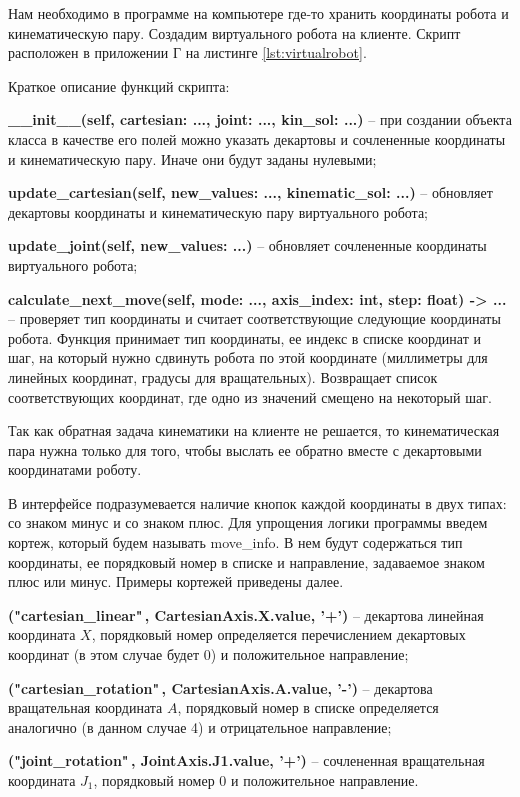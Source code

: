 \documentclass[a4paper,14pt]{extarticle}
\begin{document}
Нам необходимо в программе на компьютере
где-то хранить координаты робота и кинематическую пару.
Создадим виртуального робота на клиенте. Скрипт
расположен в приложении Г на листинге \ref{lst:virtualrobot}.


Краткое описание функций скрипта:
\begin{compactitem}
    \item \textbf{\_\_init\_\_(self, cartesian: ..., joint: ..., kin\_sol: ...)} --
    при создании объекта класса в качестве его полей можно указать декартовы и сочлененные координаты и кинематическую пару.
    Иначе они будут заданы нулевыми;
    \item \textbf{update\_cartesian(self, new\_values: ..., kinematic\_sol: ...)} --
    обновляет декартовы координаты и кинематическую пару виртуального робота;
    \item \textbf{update\_joint(self, new\_values: ...)} -- обновляет сочлененные
    координаты виртуального робота;
    \item \textbf{calculate\_next\_move(self, mode: ..., axis\_index: int, step: float) -> ...} --
    проверяет тип координаты и считает соответствующие следующие координаты робота. Функция принимает тип координаты, ее индекс
    в списке координат и шаг, на который нужно сдвинуть робота по этой координате (миллиметры для линейных координат,
    градусы для вращательных). Возвращает список соответствующих координат, где одно из значений смещено на некоторый шаг.
\end{compactitem}


Так как обратная задача кинематики на клиенте не решается, то кинематическая пара
нужна только для того, чтобы выслать ее обратно вместе с декартовыми координатами роботу.


В интерфейсе подразумевается наличие кнопок каждой координаты в двух типах: со знаком минус и со знаком плюс.
Для упрощения логики программы введем кортеж, который будем называть move\_info. В нем будут содержаться
тип координаты, ее порядковый номер в списке и направление, задаваемое знаком плюс или минус. Примеры
кортежей приведены далее.
\begin{compactitem}
    \item \textbf{("cartesian\_linear"\,, CartesianAxis.X.value, '+')} -- декартова линейная координата $X$, порядковый номер
    определяется перечислением декартовых координат (в этом случае будет 0) и положительное направление;
    \item \textbf{("cartesian\_rotation"\,, CartesianAxis.A.value, '-')} -- декартова вращательная координата $A$, порядковый
    номер в списке определяется аналогично (в данном случае 4) и отрицательное направление;
    \item \textbf{("joint\_rotation"\,, JointAxis.J1.value, '+')} -- сочлененная вращательная координата $J_1$,
    порядковый номер 0 и положительное направление.
\end{compactitem}
\end{document}
